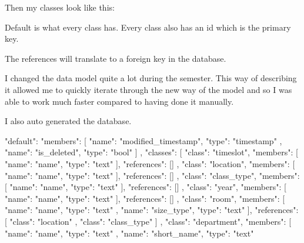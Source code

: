 Then my classes look like this:

Default is what every class has. Every class also has an id which is the primary key.

The references will translate to a foreign key in the database.

I changed the data model quite a lot during the semester. This way of describing it allowed me to quickly iterate through the new way of the model and so I was able to work much faster compared to having done it manually.

I also auto generated the database.

{
    "default": {
        "members": [
            {
                "name": "modified\_timestamp",
                "type": "timestamp"
            },
            {
                "name": "is\_deleted",
                "type": "bool"
            }
        ]
    },
    "classes": [
        {
            "class": "timeslot",
            "members": [
                {
                    "name": "name",
                    "type": "text"
                }
            ],
            "references": []
        },
        {
            "class": "location",
            "members": [
                {
                    "name": "name",
                    "type": "text"
                }
            ],
            "references": []
        },
        {
            "class": "class\_type",
            "members": [
                {
                    "name": "name",
                    "type": "text"
                }
            ],
            "references": []
        },
        {
            "class": "year",
            "members": [
                {
                    "name": "name",
                    "type": "text"
                }
            ],
            "references": []
        },
        {
            "class": "room",
            "members": [
                {
                    "name": "name",
                    "type": "text"
                },
                {
                    "name": "size\_type",
                    "type": "text"
                }
            ],
            "references": [
                {
                    "class": "location"
                },
                {
                    "class": "class\_type"
                }
            ]
        },
        {
            "class": "department",
            "members": [
                {
                    "name": "name",
                    "type": "text"
                },
                {
                    "name": "short\_name",
                    "type": "text"
}}}
